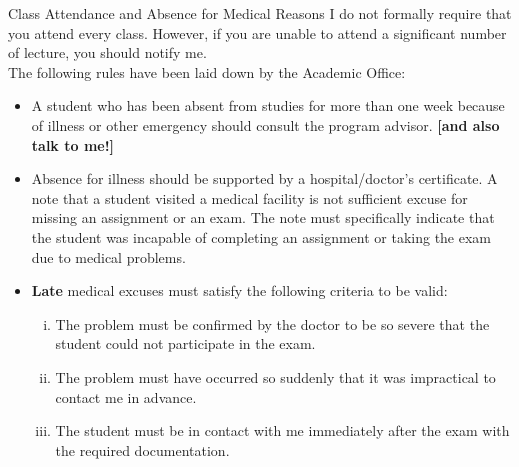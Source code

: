 \documentclass[smaller,hyperref={CJKbookmarks=true}]{beamer}
\begin{document}
\begin{frame}{Class Attendance and Absence for Medical Reasons}
I do not formally require that you attend every class. However, if you are
unable to attend a significant number of lecture, you should notify me.\\
The following rules have been laid down by the Academic Of{}fice:
\begin{itemize}
  \item A student who has been absent from studies for more than one week
because of illness or other emergency should consult the program
advisor. \textbf{[and also talk to me!]}
  \item Absence for illness should be supported by a hospital/doctor's
certificate. A note that a student visited a medical facility is \textcolor[rgb]{1.00,0.00,0.00}{not
suf{}ficient} excuse for missing an assignment or an exam. The note
must specifically indicate that the student was incapable of
completing an assignment or taking the exam due to medical
problems.
\newpage
  \item \textbf{Late} medical excuses must satisfy the following criteria to be valid:
  \begin{enumerate}[(i)]
    \item The problem must be confirmed by the doctor to be so severe that the
student could not participate in the exam.
    \item The problem must have occurred so suddenly that it was impractical to
contact me in advance.
    \item The student must be in contact with me immediately after the exam
with the required documentation.
  \end{enumerate}
\end{itemize}
\end{frame}
\end{document}
